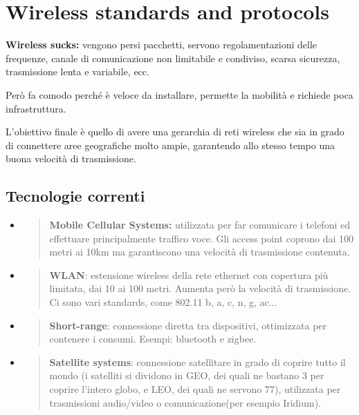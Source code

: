 \section{Wireless standards and
protocols}\label{wireless-standards-and-protocols}

\textbf{Wireless sucks:} vengono persi pacchetti, servono
regolamentazioni delle frequenze, canale di comunicazione non limitabile
e condiviso, scarsa sicurezza, trasmissione lenta e variabile, ecc.

Però fa comodo perché è veloce da installare, permette la mobilità e richiede 
poca infrastruttura.

L'obiettivo finale è quello di avere una gerarchia di reti wireless che sia in
grado di connettere aree geografiche molto ampie, garantendo allo stesso
tempo una buona velocità di trasmissione.

\subsection{Tecnologie correnti}\label{tecnologie-correnti}

\begin{itemize}
\item
  \begin{quote}
  \textbf{Mobile Cellular Systems:} utilizzata per far comunicare i
  telefoni ed effettuare principalmente traffico voce. Gli access point
  coprono dai 100 metri ai 10km ma garantiscono una velocità di
  trasmissione contenuta.
  \end{quote}
\item
  \begin{quote}
  \textbf{WLAN}: estensione wireless della rete ethernet con copertura
  più limitata, dai 10 ai 100 metri. Aumenta però la velocità di
  trasmissione. Ci sono vari standards, come 802.11 b, a, c, n, g, ac...
  \end{quote}
\item
  \begin{quote}
  \textbf{Short-range}: connessione diretta tra dispositivi, ottimizzata
  per contenere i consumi. Esempi: bluetooth e zigbee.
  \end{quote}
\item
  \begin{quote}
  \textbf{Satellite systems}: connessione satellitare in grado di
  coprire tutto il mondo (i satelliti si dividono in GEO, dei quali ne bastano 3
  per coprire l'intero globo, e LEO, dei quali ne servono 77), utilizzata per 
  trasmissioni audio/video o comunicazione(per esempio Iridium).
  \end{quote}
\end{itemize}

